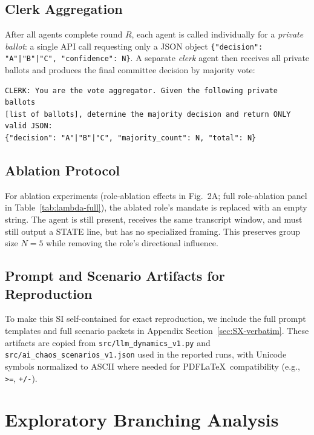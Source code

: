 \documentclass[11pt,onecolumn]{article}
\begin{document}
\subsection{Clerk Aggregation}
\label{sec:S2-clerk}

After all agents complete round $R$, each agent is called individually for a
\emph{private ballot}: a single API call requesting only a JSON object
\texttt{\{"decision": "A"|"B"|"C", "confidence": N\}}.
A separate \emph{clerk} agent then receives all private ballots and produces
the final committee decision by majority vote:
\begin{verbatim}
CLERK: You are the vote aggregator. Given the following private ballots
[list of ballots], determine the majority decision and return ONLY valid JSON:
{"decision": "A"|"B"|"C", "majority_count": N, "total": N}
\end{verbatim}

\subsection{Ablation Protocol}
\label{sec:S2-ablation}

For ablation experiments (role-ablation effects in Fig.\ 2A; full role-ablation
panel in Table~\ref{tab:lambda-full}), the ablated role's mandate is replaced with an
empty string. The agent is still present, receives the same transcript window,
and must still output a STATE line, but has no specialized framing. This
preserves group size $N = 5$ while removing the role's directional influence.

\subsection{Prompt and Scenario Artifacts for Reproduction}
\label{sec:S2-verbatim}

To make this SI self-contained for exact reproduction, we include the full
prompt templates and full scenario packets in Appendix
Section~\ref{sec:SX-verbatim}. These artifacts are copied from
\texttt{src/llm\_dynamics\_v1.py} and \texttt{src/ai\_chaos\_scenarios\_v1.json}
used in the reported runs, with Unicode symbols normalized to ASCII where
needed for PDF\LaTeX\ compatibility (e.g., \texttt{>=}, \texttt{+/-}).

\section{Exploratory Branching Analysis}
\label{sec:S3-branching}
\end{document}

